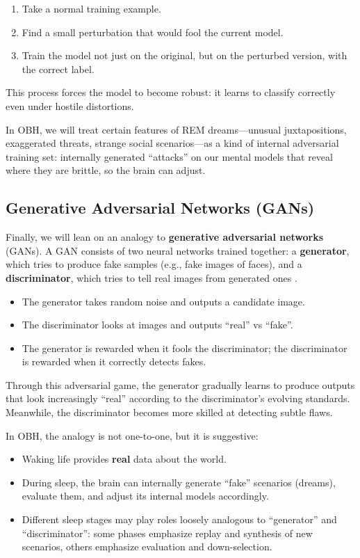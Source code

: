 \begin{enumerate}
    \item Take a normal training example.
    \item Find a small perturbation that would fool the current model.
    \item Train the model not just on the original, but on the perturbed version, with the correct label.
\end{enumerate}

This process forces the model to become robust: it learns to classify correctly even under hostile distortions.

In OBH, we will treat certain features of REM dreams---unusual juxtapositions, exaggerated threats, strange social scenarios---as a kind of internal adversarial training set: internally generated ``attacks'' on our mental models that reveal where they are brittle, so the brain can adjust.

\subsection{Generative Adversarial Networks (GANs)}

Finally, we will lean on an analogy to \textbf{generative adversarial networks} (GANs). A GAN consists of two neural networks trained together: a \textbf{generator}, which tries to produce fake samples (e.g., fake images of faces), and a \textbf{discriminator}, which tries to tell real images from generated ones \citep{wikipedia_gan}.

\begin{itemize}
    \item The generator takes random noise and outputs a candidate image.
    \item The discriminator looks at images and outputs ``real'' vs ``fake''.
    \item The generator is rewarded when it fools the discriminator; the discriminator is rewarded when it correctly detects fakes.
\end{itemize}

Through this adversarial game, the generator gradually learns to produce outputs that look increasingly ``real'' according to the discriminator's evolving standards. Meanwhile, the discriminator becomes more skilled at detecting subtle flaws.

In OBH, the analogy is not one-to-one, but it is suggestive:

\begin{itemize}
    \item Waking life provides \textbf{real} data about the world.
    \item During sleep, the brain can internally generate ``fake'' scenarios (dreams), evaluate them, and adjust its internal models accordingly.
    \item Different sleep stages may play roles loosely analogous to ``generator'' and ``discriminator'': some phases emphasize replay and synthesis of new scenarios, others emphasize evaluation and down-selection.
\end{itemize}

